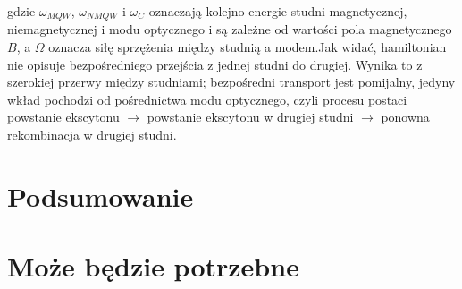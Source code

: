 \documentclass[licencjacka]{pracamgr}
\begin{document}
gdzie $\omega_{MQW}$, $\omega_{NMQW}$ i $\omega_{C}$ oznaczają kolejno energie studni magnetycznej, niemagnetycznej i modu optycznego i są zależne od wartości pola magnetycznego $B$, a $\Omega$ oznacza siłę sprzężenia między studnią a modem.Jak widać, hamiltonian nie opisuje bezpośredniego przejścia z jednej studni do drugiej. Wynika to z szerokiej przerwy między studniami; bezpośredni transport jest pomijalny, jedyny wkład pochodzi od pośrednictwa modu optycznego, czyli procesu postaci powstanie ekscytonu $\rightarrow$ powstanie ekscytonu w drugiej studni $\rightarrow$ ponowna rekombinacja w drugiej studni.%



\chapter{Podsumowanie}


\appendix

\chapter{Może będzie potrzebne}



\end{document}
